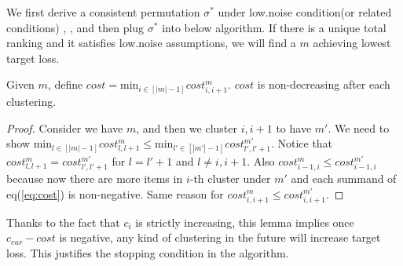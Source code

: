 	We first derive a consistent permutation $\sigma^*$ under low.noise condition(or related conditions) \cite{ramaswamy2013convex}, \cite{duchi2010ranking}, and then plug $\sigma^*$ into below algorithm. If there is a unique total ranking and it satisfies low.noise assumptions, we will find a $m$ achieving lowest target loss.
	
	\begin{lemma}
	Given $m$,  define $cost=\text{min}_{i\in [|m|-1]} cost^m_{i, i+1}$. $cost$ is non-decreasing after each clustering.
	\end{lemma}
\begin{proof}
	Consider we have $m$, and then we cluster $i, i+1$ to have $m'$. We need to show $\text{min}_{l\in [|m|-1]} cost^m_{l, l+1}\leq \text{min}_{l'\in [|m'|-1]} cost^{m'}_{l', l'+1}$. Notice that $cost^m_{l, l+1}=cost^{m'}_{l', l'+1}$ for $l=l'+1$ and $l\not= i, i+1$. Also $cost^m_{i-1, i}\leq cost^{m'}_{i-1, i}$ because now there are more items in $i$-th cluster under $m'$ and each summand  of eq(\ref{eq:cost}) is non-negative. Same reason for $cost^m_{i, i+1}\leq cost^{m'}_{i, i+1}$. 
	\end{proof}
Thanks to the fact that $c_i$ is strictly increasing, this lemma implies once $c_{cur}-cost$ is negative, any kind of clustering in the future will increase target loss. This justifies the stopping condition in the algorithm. 

